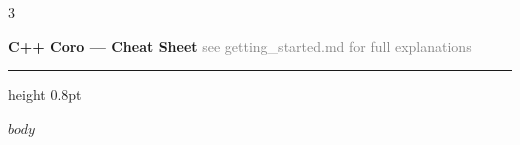 \documentclass[8pt,landscape]{extarticle}
\begin{document}
\begin{multicols}{3}

{\large\bfseries\color{headcolor} C++ Coro — Cheat Sheet}
\hfill{\tiny\textcolor{gray}{see getting\_started.md for full explanations}}
\vspace{2pt}
\textcolor{rulecolor}{\hrule height 0.8pt}
\vspace{4pt}

$body$

\end{multicols}
\end{document}
